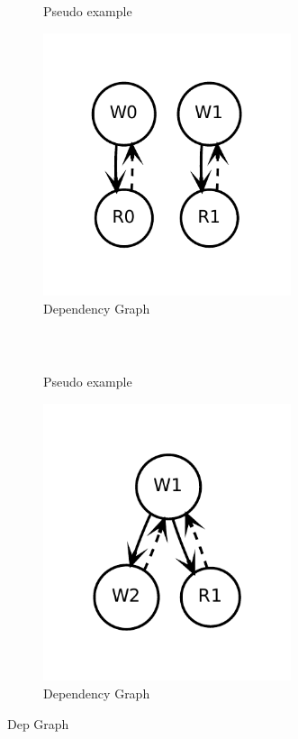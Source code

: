 \begin{figure}
\centering

\begin{subfigure}[b]{0.5\textwidth}
\inputminted{python}{code/dep1.py}
\caption{Pseudo example}
\end{subfigure}
\begin{subfigure}[b]{0.3\textwidth}
  \centering
\includegraphics[width=0.8\textwidth]{figs/dep1.pdf}
\caption{Dependency Graph}
\end{subfigure}
\\
\begin{subfigure}[b]{0.5\textwidth}
\inputminted{python}{code/dep3.py}
\caption{Pseudo example}
\end{subfigure}
\begin{subfigure}[b]{0.3\textwidth}
  \centering
\includegraphics[width=0.8\textwidth]{figs/dep3.pdf}
\caption{Dependency Graph}
\end{subfigure}

\caption[Dep Graph]{
    Dep Graph
}
\label{fig:depexp}
\end{figure}

